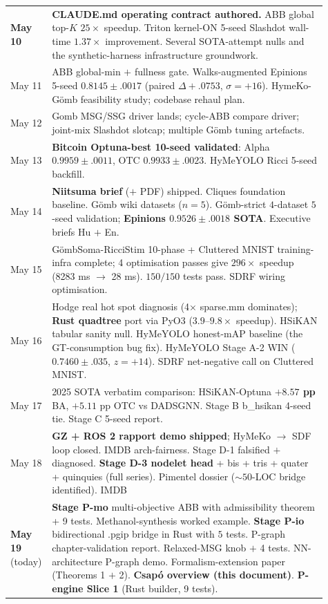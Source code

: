 \documentclass[11pt,a4paper]{article}
\theoremstyle{plain}
\theoremstyle{definition}
\begin{document}
\begin{center}
\begin{tabular}{p{0.06\linewidth} p{0.85\linewidth}}
\textbf{May 10} & \textbf{CLAUDE.md operating contract authored.}
        ABB global top-$K$ $25\times$ speedup. Triton kernel-ON
        5-seed Slashdot wall-time $1.37\times$ improvement.
        Several SOTA-attempt nulls and the synthetic-harness
        infrastructure groundwork. \\
May 11 & ABB global-min $+$ fullness gate. Walks-augmented
        Epinions 5-seed $0.8145 \pm .0017$ (paired $\Delta +.0753$,
        $\sigma{=}{+}16$). HymeKo-Gömb feasibility study;
        codebase rehaul plan. \\
May 12 & Gomb MSG/SSG driver lands; cycle-ABB compare driver;
        joint-mix Slashdot slotcap; multiple Gömb tuning artefacts. \\
May 13 & \textbf{Bitcoin Optuna-best 10-seed validated}: Alpha
        $0.9959 \pm .0011$, OTC $0.9933 \pm .0023$. HyMeYOLO
        Ricci 5-seed backfill. \\
May 14 & \textbf{Niitsuma brief} ($+$ PDF) shipped. Cliques
        foundation baseline. Gömb wiki datasets ($n{=}5$).
        Gömb-strict $4$-dataset $5$-seed validation;
        \textbf{Epinions $0.9526 \pm .0018$ SOTA}. Executive briefs
        Hu $+$ En. \\
May 15 & GömbSoma-RicciStim 10-phase + Cluttered MNIST
        training-infra complete; 4 optimisation passes give
        $296\times$ speedup (8283 ms $\to$ 28 ms). $150 / 150$ tests
        pass. SDRF wiring optimisation. \\
May 16 & Hodge real hot spot diagnosis (4× sparse.mm dominates);
        \textbf{Rust quadtree} port via PyO3 ($3.9$–$9.8\times$
        speedup). HSiKAN tabular sanity null. HyMeYOLO
        honest-mAP baseline (the GT-consumption bug fix).
        HyMeYOLO Stage A-2 WIN ($0.7460 \pm .035$, $z{=}{+}14$).
        SDRF net-negative call on Cluttered MNIST. \\
May 17 & 2025 SOTA verbatim comparison: HSiKAN-Optuna
        \textbf{$+8.57$ pp} BA, $+5.11$ pp OTC vs DADSGNN.
        Stage B b\_hsikan 4-seed tie. Stage C 5-seed report. \\
May 18 & \textbf{GZ + ROS 2 rapport demo shipped}; HyMeKo $\to$ SDF
        loop closed. IMDB arch-fairness. Stage D-1 falsified $+$
        diagnosed. \textbf{Stage D-3 nodelet head} + bis + tris +
        quater + quinquies (full series). Pimentel dossier
        ($\sim 50$-LOC bridge identified). IMDB \\
\textbf{May 19} (today) & \textbf{Stage P-mo} multi-objective ABB
        with admissibility theorem + 9 tests. Methanol-synthesis
        worked example. \textbf{Stage P-io} bidirectional .pgip
        bridge in Rust with $5$ tests. P-graph chapter-validation
        report. Relaxed-MSG knob $+$ 4 tests. NN-architecture
        P-graph demo. Formalism-extension paper (Theorems 1 $+$
        2). \textbf{Csap\'o overview (this document)}.
        \textbf{P-engine Slice 1} (Rust builder, 9 tests). \\
\bottomrule
\end{tabular}
\end{center}
\end{document}
